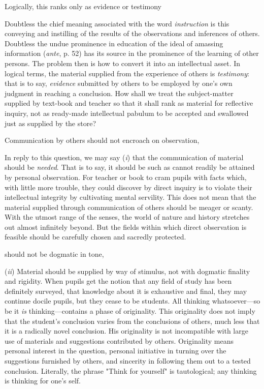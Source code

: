 \documentclass[letterpaper]{book}
\begin{document}
Logically, this ranks only as evidence or testimony

Doubtless the chief meaning associated with the word \emph{instruction}
is this conveying and instilling of the results of the observations and
inferences of others. Doubtless the undue prominence in education of the
ideal of amassing information (\emph{ante}, p. 52) has its source in the
prominence of the learning of other persons. The problem then is how to
convert it into an intellectual asset. In logical terms, the material
supplied from the experience of others is \emph{testimony}: that is to
say, \emph{evidence} submitted by others to be employed by one's own
judgment in reaching a conclusion. How shall we treat the subject-matter
supplied by text-book and teacher so that it shall rank as material for
reflective
inquiry, not as ready-made intellectual pabulum to be accepted and
swallowed just as supplied by the store?

Communication by others should not encroach on observation,

In reply to this question, we may say (\emph{i}) that the communication
of material should be \emph{needed}. That is to say, it should be such
as cannot readily be attained by personal observation. For teacher or
book to cram pupils with facts which, with little more trouble, they
could discover by direct inquiry is to violate their intellectual
integrity by cultivating mental servility. This does not mean that the
material supplied through communication of others should be meager or
scanty. With the utmost range of the senses, the world of nature and
history stretches out almost infinitely beyond. But the fields within
which direct observation is feasible should be carefully chosen and
sacredly protected.

should not be dogmatic in tone,

(\emph{ii}) Material should be supplied by way of stimulus, not with
dogmatic finality and rigidity. When pupils get the notion that any
field of study has been definitely surveyed, that knowledge about it is
exhaustive and final, they may continue docile pupils, but they cease to
be students. All thinking whatsoever---so be it \emph{is}
thinking---contains a phase of originality. This originality does not
imply that the student's conclusion varies from the conclusions of
others, much less that it is a radically novel conclusion. His
originality is not incompatible with large use of materials and
suggestions contributed by others. Originality means personal interest
in the question, personal initiative in turning over the suggestions
furnished by others, and sincerity in following them out to a tested
conclusion. Literally, the phrase "Think for yourself" is tautological;
any thinking is thinking for one's
self.
\end{document}
